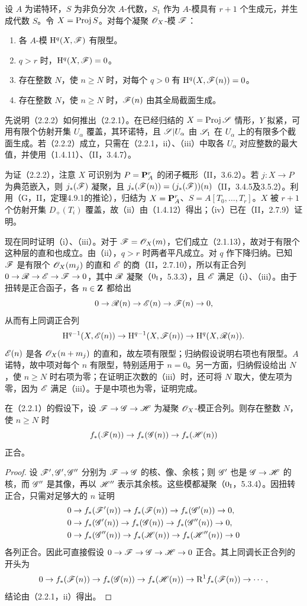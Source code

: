 设 $A$ 为诺特环，$S$ 为非负分次 $A$-代数，$S_1$ 作为 $A$-模具有 $r+1$ 个生成元，并生成代数 $S$。令 $X=\operatorname{Proj} S$。对每个凝聚 $\mathscr O_X$-模 $\mathscr F$：
\begin{enumerate}[label=(\roman*)]
\item 各 $A$-模 $\mathrm H^q(X,\mathscr F)$ 有限型。
\item $q>r$ 时，$\mathrm H^q(X,\mathscr F)=0$。
\item 存在整数 $N$，使 $n\geq N$ 时，对每个 $q>0$ 有 $\mathrm H^q(X,\mathscr F(n))=0$。
\item 存在整数 $N$，使 $n\geq N$ 时，$\mathscr F(n)$ 由其全局截面生成。
\end{enumerate}
先说明（2.2.2）如何推出（2.2.1）。在已经归结的 $X=\operatorname{Proj}\mathscr S$ 情形，$Y$ 拟紧，可用有限个仿射开集 $U_\alpha$ 覆盖，其环诺特，且 $\mathscr S|U_\alpha$ 由 $\mathscr S_1$ 在 $U_\alpha$ 上的有限多个截面生成。若（2.2.2）成立，只需在（2.2.1，ii）、（iii）中取各 $U_\alpha$ 对应整数的最大值，并使用（1.4.11）、（II，3.4.7）。

为证（2.2.2），注意 $X$ 可识别为 $P=\mathbf P_A^r$ 的闭子概形（II，3.6.2）。若 $j:X\to P$ 为典范嵌入，则 $j_*(\mathscr F)$ 凝聚，且 $j_*(\mathscr F(n))=(j_*(\mathscr F))(n)$（II，3.4.5及3.5.2）。利用（G，II，定理4.9.1的推论），归结为 $X=\mathbf P_A^r$、$S=A[T_0,\ldots,T_r]$。$X$ 被 $r+1$ 个仿射开集 $D_+(T_i)$ 覆盖，故（ii）由（1.4.12）得出；（iv）已在（II，2.7.9）证明。

现在同时证明（i）、（iii）。对于 $\mathscr F=\mathscr O_X(m)$，它们成立（2.1.13），故对于有限个这种层的直和也成立。由（ii），$q>r$ 时两者平凡成立。对 $q$ 作下降归纳。已知 $\mathscr F$ 是有限个 $\mathscr O_X(m_j)$ 的直和 $\mathscr E$ 的商（II，2.7.10），所以有正合列 $0\to\mathscr R\to\mathscr E\to\mathscr F\to0$，其中 $\mathscr R$ 凝聚（$0_{\mathrm I}$，5.3.3），且 $\mathscr E$ 满足（i）、（iii）。由于扭转是正合函子，各 $n\in\mathbf Z$ 都给出
\[
0\to\mathscr R(n)\to\mathscr E(n)\to\mathscr F(n)\to0,
\]
从而有上同调正合列
\[
\mathrm H^{q-1}(X,\mathscr E(n))\to\mathrm H^{q-1}(X,\mathscr F(n))\to\mathrm H^q(X,\mathscr R(n)).
\]
$\mathscr E(n)$ 是各 $\mathscr O_X(n+m_j)$ 的直和，故左项有限型；归纳假设说明右项也有限型。$A$ 诺特，故中项对每个 $n$ 有限型，特别适用于 $n=0$。另一方面，归纳假设给出 $N$，使 $n\geq N$ 时右项为零；在证明正次数的（iii）时，还可将 $N$ 取大，使左项为零，因为 $\mathscr E$ 满足（iii）。于是中项也为零，证明完成。\finishproof

在（2.2.1）的假设下，设 $\mathscr F\to\mathscr G\to\mathscr H$ 为凝聚 $\mathscr O_X$-模正合列。则存在整数 $N$，使 $n\geq N$ 时
\[
f_*(\mathscr F(n))\to f_*(\mathscr G(n))\to f_*(\mathscr H(n))
\]
正合。
\begin{proof}
设 $\mathscr F',\mathscr G',\mathscr G''$ 分别为 $\mathscr F\to\mathscr G$ 的核、像、余核；则 $\mathscr G'$ 也是 $\mathscr G\to\mathscr H$ 的核，而 $\mathscr G''$ 是其像，再以 $\mathscr H''$ 表示其余核。这些模都凝聚（$0_{\mathrm I}$，5.3.4）。因扭转正合，只需对足够大的 $n$ 证明
\[
\begin{aligned}
0&\to f_*(\mathscr F'(n))\to f_*(\mathscr F(n))\to f_*(\mathscr G'(n))\to0,\\
0&\to f_*(\mathscr G'(n))\to f_*(\mathscr G(n))\to f_*(\mathscr G''(n))\to0,\\
0&\to f_*(\mathscr G''(n))\to f_*(\mathscr H(n))\to f_*(\mathscr H''(n))\to0
\end{aligned}
\]
各列正合。因此可直接假设 $0\to\mathscr F\to\mathscr G\to\mathscr H\to0$ 正合。其上同调长正合列的开头为
\[
0\to f_*(\mathscr F(n))\to f_*(\mathscr G(n))\to f_*(\mathscr H(n))\to\mathrm R^1f_*(\mathscr F(n))\to\cdots,
\]
结论由（2.2.1，ii）得出。
\end{proof}

